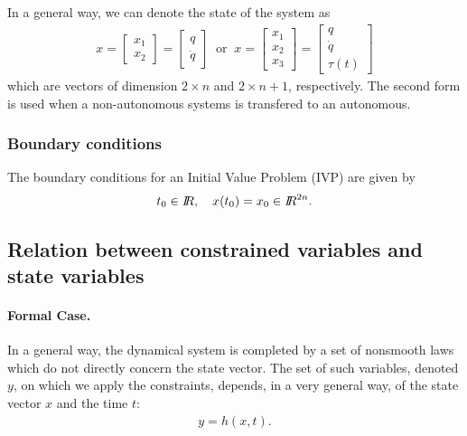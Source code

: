 \documentclass[10pt]{article}
\newcommand{\RR}{\mbox{\rm $I\!\!R$}}
\begin{document}
In a general way, we can denote the state of the system as 
\begin{eqnarray}
  x = 
  \left[\begin{array}{c}
  x_1 \\
  x_2 
  \end{array}\right] =  
  \left[\begin{array}{c}
  q \\
  \dot q
  \end{array}\right]
\ \textrm{ or } \
  x = 
  \left[\begin{array}{c}
  x_1 \\
  x_2 \\
  x_3
  \end{array}\right] =  
  \left[\begin{array}{c}
  q \\
  \dot q \\
  \tau(t)
  \end{array}\right]  
\end{eqnarray}
which are vectors of dimension $2\times n$ and $2\times n + 1$, respectively. The second form is used when a non-autonomous systems is transfered to an autonomous. 

\subsubsection*{Boundary conditions}
The boundary conditions for an Initial Value Problem (IVP) are given by
\begin{equation}
  \label{eq:3}
  t_0 \in \RR,\quad x(t_0)=x_0 \in \RR^{2n}.
\end{equation}

\subsection{Relation between constrained variables and state variables}
\paragraph{Formal Case.} In a general way, the dynamical system is completed by a set of nonsmooth laws which do not   directly concern the state vector. The set of such variables, denoted $y$, on which we apply the constraints, depends, in a very general way, of the state vector $x$ and the time $t$:
\begin{eqnarray}
  \label{eq:y}
  y=h(x,t).
\end{eqnarray}
 
\end{document}
